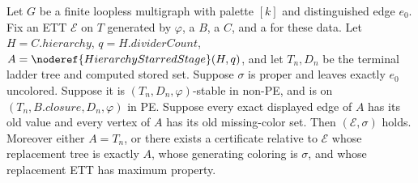 \begin{helper}
Let $G$ be a finite loopless multigraph with palette $[k]$ and
distinguished edge $e_0$.  Fix an ETT $\mathcal E$ on $T$ generated
by $\varphi$, a  $B$, a
 $C$, and a
 for these data.
Let $H=C.\mathit{hierarchy}$, $q=H.\mathit{dividerCount}$,
$A=\noderef{HierarchyStarredStage}(H,q)$, and let $T_n,D_n$
be the terminal ladder tree and computed stored set.
Suppose $\sigma$ is proper and leaves exactly $e_0$ uncolored.
Suppose it is $(T_n,D_n,\varphi)$-stable in non-PE, and is
 on $(T_n,B.\mathit{closure},D_n,\varphi)$
in PE.  Suppose every exact displayed edge of $A$ has its old value
and every vertex of $A$ has its old missing-color set.
Then $(\mathcal E,\sigma)$ holds.
Moreover either $A=T_n$, or there exists a
 certificate relative to
$\mathcal E$ whose replacement tree is exactly $A$, whose generating
coloring is $\sigma$, and whose replacement ETT has maximum property.
\end{helper}
